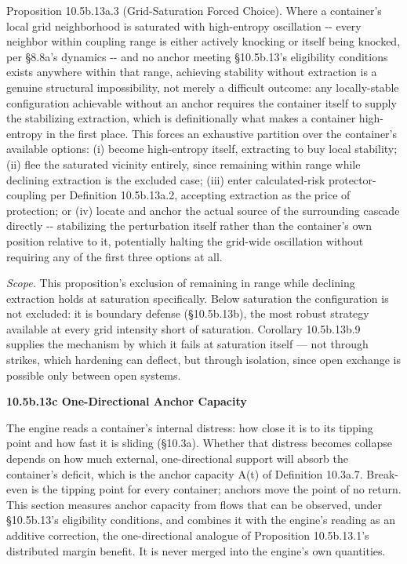 \documentclass[
]{article}
\begin{document}
Proposition 10.5b.13a.3 (Grid-Saturation Forced Choice). Where a
container's local grid neighborhood is saturated with high-entropy
oscillation -\/- every neighbor within coupling range is either actively
knocking or itself being knocked, per §8.8a's dynamics -\/- and no
anchor meeting §10.5b.13's eligibility conditions exists anywhere within
that range, achieving stability without extraction is a genuine
structural impossibility, not merely a difficult outcome: any
locally-stable configuration achievable without an anchor requires the
container itself to supply the stabilizing extraction, which is
definitionally what makes a container high-entropy in the first place.
This forces an exhaustive partition over the container's available
options: (i) become high-entropy itself, extracting to buy local
stability; (ii) flee the saturated vicinity entirely, since remaining
within range while declining extraction is the excluded case; (iii)
enter calculated-risk protector-coupling per Definition 10.5b.13a.2,
accepting extraction as the price of protection; or (iv) locate and
anchor the actual source of the surrounding cascade directly -\/-
stabilizing the perturbation itself rather than the container's own
position relative to it, potentially halting the grid-wide oscillation
without requiring any of the first three options at all.

\emph{Scope.} This proposition's exclusion of remaining in range while
declining extraction holds at saturation specifically. Below saturation
the configuration is not excluded: it is boundary defense (§10.5b.13b),
the most robust strategy available at every grid intensity short of
saturation. Corollary 10.5b.13b.9 supplies the mechanism by which it
fails at saturation itself --- not through strikes, which hardening can
deflect, but through isolation, since open exchange is possible only
between open systems.

\textbf{10.5b.13c One-Directional Anchor Capacity}

The engine reads a container's internal distress: how close it is to its
tipping point and how fast it is sliding (§10.3a). Whether that distress
becomes collapse depends on how much external, one-directional support
will absorb the container's deficit, which is the anchor capacity A(t)
of Definition 10.3a.7. Break-even is the tipping point for every
container; anchors move the point of no return. This section measures
anchor capacity from flows that can be observed, under §10.5b.13's
eligibility conditions, and combines it with the engine's reading as an
additive correction, the one-directional analogue of Proposition
10.5b.13.1's distributed margin benefit. It is never merged into the
engine's own quantities.
\end{document}
